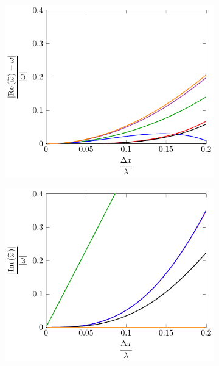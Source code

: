 \begin{figure}
	\centering
	\begin{subfigure}{0.5\textwidth}
		\includegraphics[width=\textwidth]{./chp4/figures/Dispu0khFillRez.pdf}
	\end{subfigure}%
	\begin{subfigure}{0.5\textwidth}
		\includegraphics[width=\textwidth]{./chp4/figures/Dispu0khFillImz.pdf}
	\end{subfigure}
	\par\bigskip

\end{figure}
